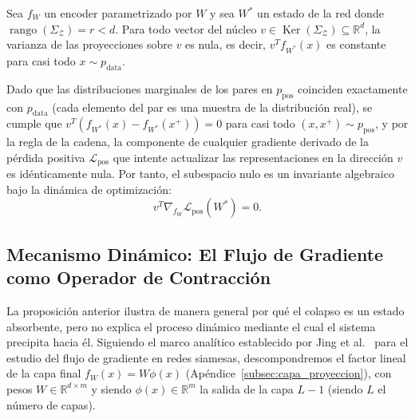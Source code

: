 \begin{proposition}
Sea $f_W$ un encoder parametrizado por $W$ y sea $W^*$ un estado de la red donde $\operatorname{rango}(\Sigma_\mathcal{Z}) = r < d$. Para todo vector del núcleo $v \in \operatorname{Ker}(\Sigma_\mathcal{Z}) \subseteq \mathbb{R}^d$, la varianza de las proyecciones sobre $v$ es nula, es decir, $v^T f_{W^*}(x)$ es constante para casi todo $x \sim p_{\text{data}}.$ 

Dado que las distribuciones marginales de los pares en $p_{\text{pos}}$ coinciden exactamente con $p_{\text{data}}$ (cada elemento del par es una muestra de la distribución real), se cumple que $v^T(f_{W^*}(x) - f_{W^*}(x^+)) = 0$ para casi todo $(x, x^+) \sim p_{\text{pos}}$, y por la regla de la cadena, la componente de cualquier gradiente derivado de la pérdida positiva $\mathcal{L}_{\text{pos}}$ que intente actualizar las representaciones en la dirección $v$ es idénticamente nula. Por tanto, el subespacio nulo es un invariante algebraico bajo la dinámica de optimización:
\begin{equation}
    v^T \nabla_{f_W} \mathcal{L}_{\text{pos}}(W^*) = 0.
\end{equation}
\end{proposition}

\subsection*{Mecanismo Dinámico: El Flujo de Gradiente como Operador de Contracción}

La proposición anterior ilustra de manera general por qué el colapso es un estado absorbente, pero no explica el proceso dinámico mediante el cual el sistema precipita hacia él. Siguiendo el marco analítico establecido por Jing et al.~\cite{jing2022understanding} para el estudio del flujo de gradiente en redes siamesas, descompondremos el factor lineal de la capa final $f_W(x) = W\phi(x)$ (Apéndice~\ref{subsec:capa_proyeccion}), con pesos $W \in \mathbb{R}^{d \times m}$ y siendo $\phi(x) \in \mathbb{R}^{m}$ la salida de la capa $L-1$ (siendo $L$ el número de capas).

